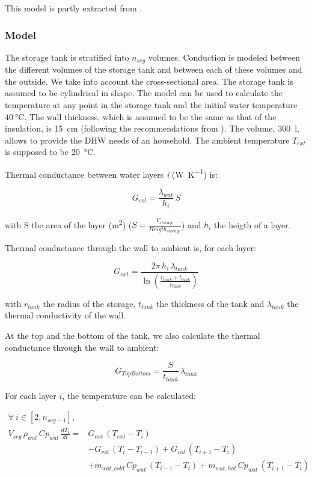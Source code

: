 \documentclass[letterpaper,11pt]{article}
\begin{document}
This model is partly extracted from \parencite{patur2023}.

\subsubsection{Model}

The storage tank is stratified into $n_{seg}$ volumes. Conduction is modeled between the different volumes of the storage tank and between each of these volumes and the outside. We take into account the cross-sectional area. The storage tank is assumed to be cylindrical in shape. The model can be used to calculate the temperature at any point in the storage tank and the initial water temperature $\qty{40}{\celsius}$. The wall thickness, which is assumed to be the same as that of the insulation, is \SI{15}{\centi\meter} (following the recommendations from \parencite{energieplus}). The volume, \qty{300}{\litre}, allows to provide the DHW needs of an household. The ambient temperature $T_{ext}$ is supposed to be \qty{20}{\celsius}.

Thermal conductance between water layers \textit{i} (\unit{\watt\per\kelvin}) is:

\begin{equation}
	G_{vol} = \frac{\lambda_{wat}}{h_i} \, S
\end{equation}

with S the area of the layer (\unit{\metre\squared}) ($S = \frac{V_{storage}}{Heigth_{storage}}$) and $h_i$ the heigth of a layer.

Thermal conductance through the wall to ambient is, for each layer:

\begin{equation}
	G_{ext} = \frac{2\pi \, h_i \, \lambda_{tank}}{\ln\left(\frac{r_{tank}+t_{tank}}{r_{tank}} \right)}
\end{equation}

with $r_{tank}$ the radius of the storage, $t_{tank}$ the thickness of the tank and $\lambda_{tank}$ the thermal conductivity of the wall.

At the top and the bottom of the tank, we also calculate the thermal conductance through the wall to ambient:

\begin{equation}
	G_{TopBottom} = \frac{S}{t_{tank}} \, \lambda_{tank}
\end{equation}

For each layer $i$, the temperature can be calculated:

\begin{equation}
	\begin{aligned}
		\forall\ i \in [2, n_{seg-1}], \\
		V_{seg} \, \rho_{wat} \, Cp_{wat} \, \frac{dT_i}{dt} = & G_{ext} \, (T_{ext} - T_i) \\
		& - G_{vol} \, (T_i-T_{i-1}) + G_{vol} \, (T_{i+1}-T_{i}) \\
		& + \dot{m}_{wat,cold} \, Cp_{wat} \, (T_{i-1} - T_{i}) + \dot{m}_{wat,hot} \, Cp_{wat} \, (T_{i+1} - T_{i})\\
	\end{aligned}
\end{equation}
\end{document}
